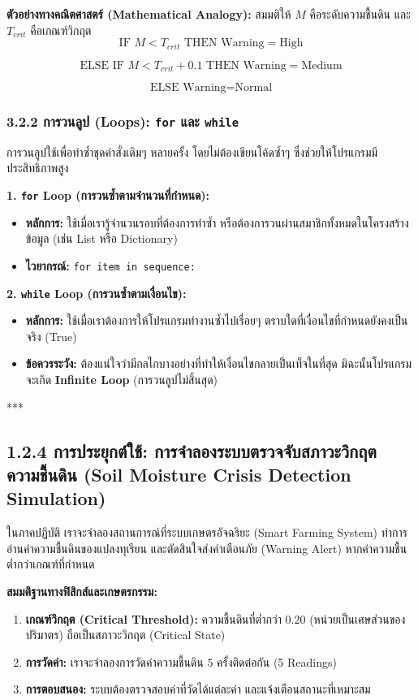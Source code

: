 \documentclass[11pt,a4paper,openany]{report}
\begin{document}
\textbf{ตัวอย่างทางคณิตศาสตร์ (Mathematical Analogy):}
สมมติให้ $M$ คือระดับความชื้นดิน และ $T_{crit}$ คือเกณฑ์วิกฤต
$$\text{IF } M < T_{crit} \text{ THEN } \text{Warning} = \text{High}$$

$$\text{ELSE IF } M < T_{crit} + 0.1 \text{ THEN } \text{Warning} = \text{Medium}$$

$$\text{ELSE } \text{Warning} = \text{Normal}$$


\subsubsection{3.2.2 การวนลูป (Loops): \texttt{for} และ \texttt{while}}


การวนลูปใช้เพื่อทำซ้ำชุดคำสั่งเดิมๆ หลายครั้ง โดยไม่ต้องเขียนโค้ดซ้ำๆ ซึ่งช่วยให้โปรแกรมมีประสิทธิภาพสูง

\textbf{1. \texttt{for} Loop (การวนซ้ำตามจำนวนที่กำหนด):}
\begin{itemize}
  \item \textbf{หลักการ:} ใช้เมื่อเรารู้จำนวนรอบที่ต้องการทำซ้ำ หรือต้องการวนผ่านสมาชิกทั้งหมดในโครงสร้างข้อมูล (เช่น List หรือ Dictionary)
  \item \textbf{ไวยากรณ์:} \texttt{for item in sequence:}
\end{itemize}


\textbf{2. \texttt{while} Loop (การวนซ้ำตามเงื่อนไข):}
\begin{itemize}
  \item \textbf{หลักการ:} ใช้เมื่อเราต้องการให้โปรแกรมทำงานซ้ำไปเรื่อยๆ ตราบใดที่เงื่อนไขที่กำหนดยังคงเป็นจริง (True)
  \item \textbf{ข้อควรระวัง:} ต้องแน่ใจว่ามีกลไกบางอย่างที่ทำให้เงื่อนไขกลายเป็นเท็จในที่สุด มิฉะนั้นโปรแกรมจะเกิด \textbf{Infinite Loop} (การวนลูปไม่สิ้นสุด)
\end{itemize}


***

\subsection{1.2.4 การประยุกต์ใช้: การจำลองระบบตรวจจับสภาวะวิกฤตความชื้นดิน (Soil Moisture Crisis Detection Simulation)}


ในภาคปฏิบัติ เราจะจำลองสถานการณ์ที่ระบบเกษตรอัจฉริยะ (Smart Farming System) ทำการอ่านค่าความชื้นดินของแปลงทุเรียน และตัดสินใจส่งคำเตือนภัย (Warning Alert) หากค่าความชื้นต่ำกว่าเกณฑ์ที่กำหนด

\textbf{สมมติฐานทางฟิสิกส์และเกษตรกรรม:}
\begin{enumerate}
  \item \textbf{เกณฑ์วิกฤต (Critical Threshold):} ความชื้นดินที่ต่ำกว่า $0.20$ (หน่วยเป็นเศษส่วนของปริมาตร) ถือเป็นสภาวะวิกฤต (Critical State)
  \item \textbf{การวัดค่า:} เราจะจำลองการวัดค่าความชื้นดิน 5 ครั้งติดต่อกัน (5 Readings)
  \item \textbf{การตอบสนอง:} ระบบต้องตรวจสอบค่าที่วัดได้แต่ละค่า และแจ้งเตือนสถานะที่เหมาะสม
\end{enumerate}
\end{document}

